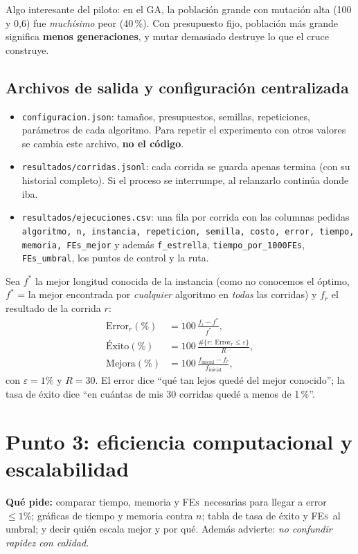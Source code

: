 \documentclass[11pt,a4paper]{article}
\newcommand{\FEs}{\textsc{FEs}}
\newcommand{\archivo}[1]{\texttt{#1}}
\begin{document}
Algo interesante del piloto: en el GA, la población grande con mutación alta (100 y 0{,}6) fue \emph{muchísimo} peor (40\,\%).
Con presupuesto fijo, población más grande significa \textbf{menos generaciones}, y mutar demasiado destruye lo que el cruce construye.

\subsection{Archivos de salida y configuración centralizada}
\begin{itemize}
\item \archivo{configuracion.json}: tamaños, presupuestos, semillas, repeticiones, parámetros de cada algoritmo. Para repetir el experimento con
otros valores se cambia este archivo, \textbf{no el código}.
\item \archivo{resultados/corridas.jsonl}: cada corrida se guarda apenas termina (con su historial completo). Si el proceso se interrumpe,
al relanzarlo continúa donde iba.
\item \archivo{resultados/ejecuciones.csv}: una fila por corrida con las columnas pedidas
\texttt{algoritmo, n, instancia, repeticion, semilla, costo, error, tiempo, memoria, FEs\_mejor} y además \texttt{f\_estrella},
\texttt{tiempo\_por\_1000FEs}, \texttt{FEs\_umbral}, los puntos de control y la ruta.
\end{itemize}

\begin{mate}
Sea $f^\ast$ la mejor longitud conocida de la instancia (como no conocemos el óptimo, $f^\ast$ = la mejor encontrada por \emph{cualquier} algoritmo
en \emph{todas} las corridas) y $f_r$ el resultado de la corrida $r$:
\begin{align*}
\text{Error}_r(\%)&=100\,\frac{f_r-f^\ast}{f^\ast},\\
\text{Éxito}(\%)&=100\,\frac{\#\{r:\ \text{Error}_r\le\varepsilon\}}{R},\\
\text{Mejora}(\%)&=100\,\frac{f_{\text{inicial}}-f_r}{f_{\text{inicial}}},
\end{align*}
con $\varepsilon=1\text{\%}$ y $R=30$. El error dice ``qué tan lejos quedé del mejor conocido''; la tasa de éxito dice ``en cuántas de mis 30 corridas
quedé a menos de 1\,\%''.
\end{mate}

\section{Punto 3: eficiencia computacional y escalabilidad}\label{sec:p3}
\textbf{Qué pide:} comparar tiempo, memoria y \FEs\ necesarias para llegar a error $\le1\text{\%}$; gráficas de tiempo y memoria contra $n$;
tabla de tasa de éxito y \FEs\ al umbral; y decir quién escala mejor y por qué. Además advierte: \emph{no confundir rapidez con calidad}.
\end{document}
